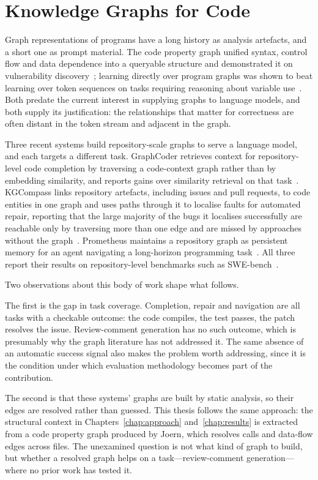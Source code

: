 \section{Knowledge Graphs for Code}
\label{sec:sota-kg}

Graph representations of programs have a long history as analysis artefacts, and a
short one as prompt material. The code property graph unified syntax, control flow
and data dependence into a queryable structure and demonstrated it on vulnerability
discovery~\cite{yamaguchi2014cpg}; learning directly over program graphs was shown
to beat learning over token sequences on tasks requiring reasoning about variable
use~\cite{allamanis2018programgraphs}. Both predate the current interest in
supplying graphs to language models, and both supply its justification: the
relationships that matter for correctness are often distant in the token stream and
adjacent in the graph.

Three recent systems build repository-scale graphs to serve a language model, and
each targets a different task. GraphCoder retrieves context for repository-level
code completion by traversing a code-context graph rather than by embedding
similarity, and reports gains over similarity retrieval on that
task~\cite{liu2024graphcoder}. KGCompass links repository artefacts, including
issues and pull requests, to code entities in one graph and uses paths through it to
localise faults for automated repair, reporting that the large majority of the
bugs it localises successfully are reachable only by traversing more than one edge
and are missed by approaches without the graph~\cite{yang2025kgcompass}. Prometheus
maintains a repository graph as persistent memory for an agent navigating a
long-horizon programming task~\cite{pan2025prometheus}. All three report their
results on repository-level benchmarks such as
SWE-bench~\cite{jimenez2024swebench}.

Two observations about this body of work shape what follows.

The first is the gap in task coverage. Completion, repair and navigation are all
tasks with a checkable outcome: the code compiles, the test passes, the patch
resolves the issue. Review-comment generation has no such outcome, which is
presumably why the graph literature has not addressed it. The same absence of
an automatic success signal also makes the problem worth addressing, since it is the
condition under which evaluation methodology becomes part of the contribution.

The second is that these systems' graphs are built by static analysis, so their
edges are resolved rather than guessed. This thesis follows the same approach: the
structural context in Chapters~\ref{chap:approach} and~\ref{chap:results} is
extracted from a code property graph produced by Joern, which resolves calls and
data-flow edges across files. The unexamined question is not what kind of graph to
build, but whether a resolved graph helps on a task---review-comment
generation---where no prior work has tested it.

